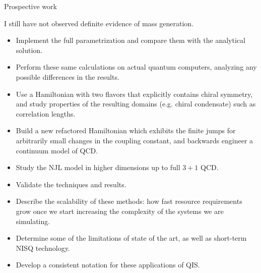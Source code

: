 \documentclass[9pt, handout, aspectratio=169]{beamer}	%
\begin{document}
\begin{frame}{Prospective work}

	I still have not observed definite evidence of mass generation.

	\medskip

	\begin{itemize}
		\item Implement the full parametrization and compare them with the analytical solution.
		\item Perform these same calculations on actual quantum computers, analyzing any possible differences in the results.
		\item Use a Hamiltonian with two flavors that explicitly contains chiral symmetry, and study properties of the resulting domains (e.g. chiral condensate) such as correlation lengths.
		\item Build a new refactored Hamiltonian which exhibits the finite jumps for arbitrarily small changes in the coupling constant, and backwards engineer a continuum model of QCD.
		\item Study the NJL model in higher dimensions up to full $3+1$ QCD.
		\item Validate the techniques and results.
		\item Describe the scalability of these methods: how fast resource requirements grow once we start increasing the complexity of the systems we are simulating.
		\item Determine some of the limitations of state of the art, as well as short-term NISQ technology.
		\item Develop a consistent notation for these applications of QIS.
	\end{itemize}

\end{frame}


\end{document}
